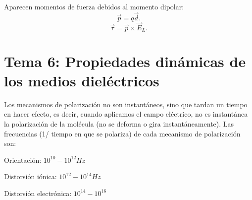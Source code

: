 \begin{tcolorbox}[enhanced,attach boxed title to top center={yshift=-3mm,yshifttext=-1mm},
      colback=blue!5!white,colframe=blue!75!black,colbacktitle=blue!80!black,
        title= Polarización por orientación $\alpha_d$,fonttitle=\bfseries,
          boxed title style={size=small,colframe=blue!50!black} ]

Aparecen momentos de fuerza debidos al momento dipolar:
\[
    \vec{p}= q \vec{d}
.\] 
\[
    \vec{\tau}=\vec{p}\times \vec{E}_L
.\]     



          \end{tcolorbox}


\section{Tema 6: Propiedades dinámicas de los medios dieléctricos}
Los mecanismos de polarización no son instantáneos, sino que tardan un tiempo en hacer efecto, es decir, cuando aplicamos el campo eléctrico, no es instantánea la polarización de la molécula (no se deforma o gira instantáneamente). Las frecuencias (1/ tiempo en que se polariza) de cada mecanismo de polarización son:
\begin{center}
    \begin{itemize}
        \begin{center}
            
        \item[Orientación:] $10^{10} - 10^{12} Hz$
        \item[Distorsión iónica: ] $10^{12} - 10^{14} Hz$ 
        \item[Distorsión electrónica: ]$10^{14}- 10^{16}$

        \end{center}
    \end{itemize}
\end{center}

